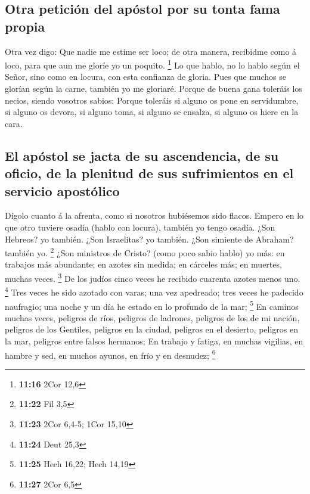 \hypertarget{otra-peticiuxf3n-del-apuxf3stol-por-su-tonta-fama-propia}{%
\subsection{Otra petición del apóstol por su tonta fama
propia}\label{otra-peticiuxf3n-del-apuxf3stol-por-su-tonta-fama-propia}}

 Otra vez digo: Que nadie me estime ser loco; de otra
manera, recibidme como á loco, para que aun me gloríe yo un poquito.
\footnote{\textbf{11:16} 2Cor 12,6}  Lo que hablo, no lo
hablo según el Señor, sino como en locura, con esta confianza de gloria.
 Pues que muchos se glorían según la carne, también yo me
gloriaré.  Porque de buena gana toleráis los necios, siendo
vosotros sabios:  Porque toleráis si alguno os pone en
servidumbre, si alguno os devora, si alguno toma, si alguno se ensalza,
si alguno os hiere en la cara.

\hypertarget{el-apuxf3stol-se-jacta-de-su-ascendencia-de-su-oficio-de-la-plenitud-de-sus-sufrimientos-en-el-servicio-apostuxf3lico}{%
\subsection{El apóstol se jacta de su ascendencia, de su oficio, de la
plenitud de sus sufrimientos en el servicio
apostólico}\label{el-apuxf3stol-se-jacta-de-su-ascendencia-de-su-oficio-de-la-plenitud-de-sus-sufrimientos-en-el-servicio-apostuxf3lico}}

 Dígolo cuanto á la afrenta, como si nosotros hubiésemos
sido flacos. Empero en lo que otro tuviere osadía (hablo con locura),
también yo tengo osadía.  ¿Son Hebreos? yo también. ¿Son
Israelitas? yo también. ¿Son simiente de Abraham? también yo.
\footnote{\textbf{11:22} Fil 3,5}  ¿Son ministros de
Cristo? (como poco sabio hablo) yo más: en trabajos más abundante; en
azotes sin medida; en cárceles más; en muertes, muchas veces.
\footnote{\textbf{11:23} 2Cor 6,4-5; 1Cor 15,10}  De los
judíos cinco veces he recibido cuarenta azotes menos uno. \footnote{\textbf{11:24}
  Deut 25,3}  Tres veces he sido azotado con varas; una vez
apedreado; tres veces he padecido naufragio; una noche y un día he
estado en lo profundo de la mar; \footnote{\textbf{11:25} Hech 16,22;
  Hech 14,19}  En caminos muchas veces, peligros de ríos,
peligros de ladrones, peligros de los de mi nación, peligros de los
Gentiles, peligros en la ciudad, peligros en el desierto, peligros en la
mar, peligros entre falsos hermanos;  En trabajo y fatiga,
en muchas vigilias, en hambre y sed, en muchos ayunos, en frío y en
desnudez; \footnote{\textbf{11:27} 2Cor 6,5}

